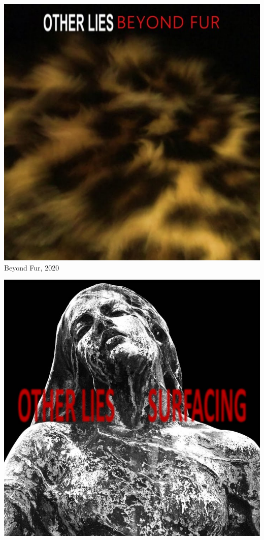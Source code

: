 \begin{titlepage}
  \maketitle
  \thispagestyle{empty}
  \setcounter{page}{0}

  \vspace{2em}
  
  \begin{minipage}[t]{.5\textwidth}
    \centering
    \includegraphics[height=0.25\textheight]{1-Beyond-Fur/beyond-fur.jpg}\\
    {\Large \sffamily Beyond Fur, 2020}
  \end{minipage}%
  \begin{minipage}[t]{0.5\textwidth}
    \centering
    \includegraphics[height=0.25\textheight]{2-Surfacing/surfacing.jpg}\\

\end{minipage}
\end{titlepage}
